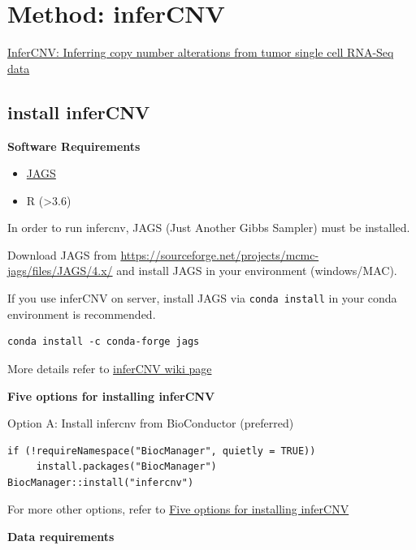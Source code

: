 \documentclass[
]{book}
\providecommand{\tightlist}{%
  \setlength{\itemsep}{0pt}\setlength{\parskip}{0pt}}
\begin{document}
\hypertarget{method-infercnv}{%
\section{Method: inferCNV}\label{method-infercnv}}

\href{https://github.com/broadinstitute/inferCNV/wiki}{InferCNV: Inferring copy number alterations from tumor single cell RNA-Seq data}

\hypertarget{install-infercnv}{%
\subsection{install inferCNV}\label{install-infercnv}}

\textbf{Software Requirements}

\begin{itemize}
\tightlist
\item
  \href{https://mcmc-jags.sourceforge.io/}{JAGS}
\item
  R (\textgreater3.6)
\end{itemize}

In order to run infercnv, JAGS (Just Another Gibbs Sampler) must be installed.

Download JAGS from \url{https://sourceforge.net/projects/mcmc-jags/files/JAGS/4.x/} and install JAGS in your environment (windows/MAC).

If you use inferCNV on server, install JAGS via \texttt{conda\ install} in your conda environment is recommended.

\begin{verbatim}
conda install -c conda-forge jags
\end{verbatim}

More details refer to \href{https://github.com/broadinstitute/inferCNV/wiki}{inferCNV wiki page}

\textbf{Five options for installing inferCNV}

Option A: Install infercnv from BioConductor (preferred)

\begin{verbatim}
if (!requireNamespace("BiocManager", quietly = TRUE))
     install.packages("BiocManager")
BiocManager::install("infercnv")
\end{verbatim}

For more other options, refer to \href{https://github.com/broadinstitute/inferCNV/wiki/Installing-infercnv}{Five options for installing inferCNV}

\textbf{Data requirements}
\end{document}
